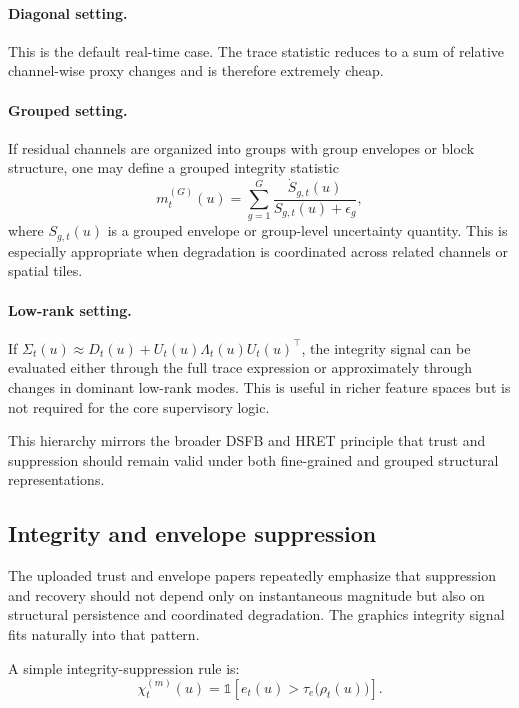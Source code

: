 \documentclass[11pt,letterpaper]{article}
\theoremstyle{gcresult}
\theoremstyle{definition}
\begin{document}
\paragraph{Diagonal setting.}
This is the default real-time case. The trace statistic reduces to a sum of relative channel-wise proxy changes and is therefore extremely cheap.

\paragraph{Grouped setting.}
If residual channels are organized into groups with group envelopes or block structure, one may define a grouped integrity statistic
\begin{equation}
m^{(G)}_t(u)=\sum_{g=1}^{G}
\frac{\dot S_{g,t}(u)}{S_{g,t}(u)+\epsilon_g},
\end{equation}
where $S_{g,t}(u)$ is a grouped envelope or group-level uncertainty quantity. This is especially appropriate when degradation is coordinated across related channels or spatial tiles.

\paragraph{Low-rank setting.}
If $\Sigma_t(u)\approx D_t(u)+U_t(u)\Lambda_t(u)U_t(u)^\top$, the integrity signal can be evaluated either through the full trace expression or approximately through changes in dominant low-rank modes. This is useful in richer feature spaces but is not required for the core supervisory logic.

This hierarchy mirrors the broader DSFB and HRET principle that trust and suppression should remain valid under both fine-grained and grouped structural representations. 


\subsection{Integrity and envelope suppression}

The uploaded trust and envelope papers repeatedly emphasize that suppression and recovery should not depend only on instantaneous magnitude but also on structural persistence and coordinated degradation. The graphics integrity signal fits naturally into that pattern.

A simple integrity-suppression rule is:
\begin{equation}
\chi^{(m)}_t(u)=
\mathbb{1}\!\left[
e_t(u)>\tau_e\bigl(\rho_t(u)\bigr)
\right].
\end{equation}
\end{document}
